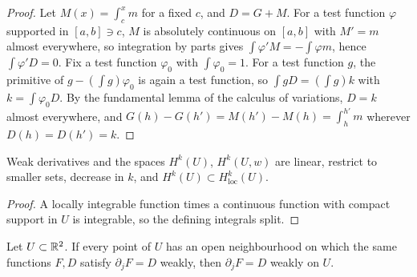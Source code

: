 \begin{proof}
\leanok
Let $M(x)=\int_c^xm$ for a fixed $c$, and $D=G+M$. For a test function $\varphi$ supported in
$[a,b]\ni c$, $M$ is absolutely continuous on $[a,b]$ with $M'=m$ almost everywhere, so
integration by parts gives $\int\varphi'M=-\int\varphi m$, hence $\int\varphi'D=0$. Fix a test
function $\varphi_0$ with $\int\varphi_0=1$. For a test function $g$, the primitive of
$g-(\int g)\varphi_0$ is again a test function, so $\int gD=(\int g)k$ with $k=\int\varphi_0D$.
By the fundamental lemma of the calculus of variations, $D=k$ almost everywhere, and
$G(h)-G(h')=M(h')-M(h)=\int_h^{h'}m$ wherever $D(h)=D(h')=k$.
\end{proof}

\begin{lemma}
\label{lem:weak-derivative-basic}
\leanok
Weak derivatives and the spaces $H^k(U)$, $H^k(U,w)$ are linear, restrict to
smaller sets, decrease in $k$, and $H^k(U)\subset H^k_{\mathrm{loc}}(U)$.
\end{lemma}

\begin{proof}
\leanok
A locally integrable function times a continuous function with compact support
in $U$ is integrable, so the defining integrals split.
\end{proof}

\begin{lemma}
\label{lem:weak-partial-locality}
\leanok
Let $U\subset\mathbb{R}^2$. If every point of $U$ has an open neighbourhood on
which the same functions $F,D$ satisfy $\partial_jF=D$ weakly, then
$\partial_jF=D$ weakly on $U$.
\end{lemma}

